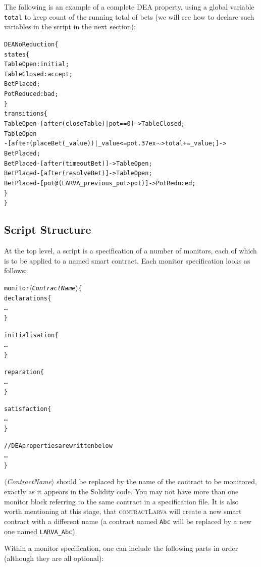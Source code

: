 \documentclass{article}
\newcommand{\contractlarva}{\textsc{contractLarva}\xspace}
\newcommand{\keyword}[1]{\textit{$\langle$#1$\rangle$}}
\newcommand{\tildearrow}{{\raise.37ex\hbox{$\scriptstyle\mathtt{\sim}$}}>\xspace}
\begin{document}
  \noindent The following is an example of a complete DEA property, using a global variable \texttt{total} to keep count of the running total of bets (we will see how to declare such variables in the script in the next section):
  
  \small\begin{alltt}
  DEA NoReduction \{
    states \{
      TableOpen: initial;
      TableClosed: accept;
      BetPlaced;
      PotReduced: bad;
    \}
    transitions \{
      TableOpen -[after(closeTable) | pot == 0 ]-> TableClosed;
      TableOpen 
        -[after(placeBet(\_value)) | \_value <= pot \tildearrow total += \_value;]-> 
          BetPlaced;
      BetPlaced -[after(timeoutBet)]-> TableOpen;
      BetPlaced -[after(resolveBet)]-> TableOpen;
      BetPlaced -[pot@(LARVA\_previous\_pot > pot)]-> PotReduced;
    \}
  \}
  \end{alltt}\normalsize
 

  \subsection{Script Structure}

  At the top level, a script is a specification of a number of monitors, each of which is to be applied to a named smart contract. Each monitor specification looks as follows:

  \small\begin{alltt}
  monitor \keyword{ContractName} \{
    declarations \{
      \ldots
    \}
    
    initialisation \{
      \ldots
    \}

    reparation \{
      \ldots
    \}

    satisfaction \{
      \ldots
    \}

    // DEA properties are written below
    \ldots
  \}
  \end{alltt}\normalsize
 
  \keyword{ContractName} should be replaced by the name of the contract to be monitored, exactly as it appears in the Solidity code. You may not have more than one monitor block referring to the same contract in a specification file. It is also worth mentioning at this stage, that \contractlarva will create a new smart contract with a different name (a contract named \texttt{Abc} will be replaced by a new one named \texttt{LARVA\_Abc}).
  
  Within a monitor specification, one can include the following parts in order (although they are all optional):
  
\end{document}
